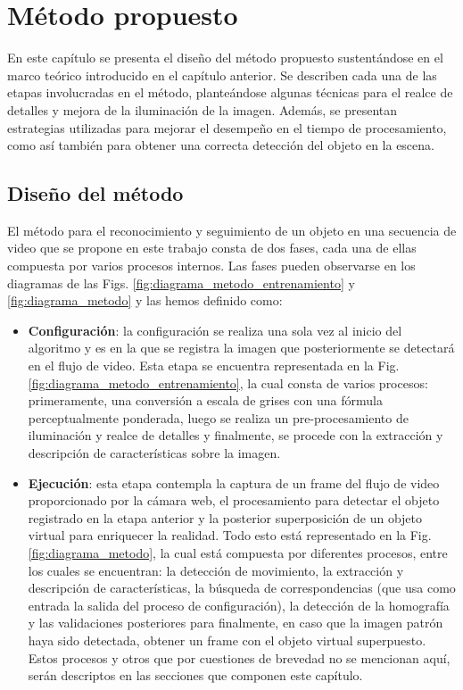 \chapter{Método propuesto}
\label{c:parte4}
\vspace{1cm}
En este capítulo se presenta el diseño del método propuesto sustentándose en el marco teórico introducido en el capítulo anterior. Se describen cada una de las etapas involucradas en el método, planteándose algunas técnicas para el realce de detalles y mejora de la iluminación de la imagen. Además, se presentan estrategias utilizadas para mejorar el desempeño en el tiempo de procesamiento, como así también para obtener una correcta detección del objeto en la escena.
\section{Diseño del método}
El método para el reconocimiento y seguimiento de un objeto en una secuencia de video que se propone en este trabajo consta de dos fases, cada una de ellas compuesta por varios procesos internos. Las fases pueden observarse en los diagramas de las Figs. \ref{fig:diagrama_metodo_entrenamiento} y \ref{fig:diagrama_metodo}  y las hemos definido como:
\begin{itemize}
 \item \textbf{Configuración}: la configuración se realiza una sola vez al inicio del algoritmo y es en la que se registra la imagen que posteriormente se detectará en el flujo de video. Esta etapa se encuentra representada en la Fig. \ref{fig:diagrama_metodo_entrenamiento}, la cual consta de varios procesos: primeramente, una conversión a escala de grises con una fórmula perceptualmente ponderada, luego se realiza un pre-procesamiento de iluminación y realce de detalles y finalmente, se procede con la extracción y descripción de características sobre la imagen.
 \item \textbf{Ejecución}: esta etapa contempla la captura de un frame del flujo de video proporcionado por la cámara web, el procesamiento para detectar el objeto registrado en la etapa anterior y la posterior superposición de un objeto virtual para enriquecer la realidad. Todo esto está representado en la Fig. \ref{fig:diagrama_metodo}, la cual está compuesta por diferentes procesos, entre los cuales se encuentran: la detección de movimiento, la extracción y descripción de características, la búsqueda de correspondencias (que usa como entrada la salida del proceso de configuración), la detección de la homografía y las validaciones posteriores para finalmente, en caso que la imagen patrón haya sido detectada, obtener un frame con el objeto virtual superpuesto. Estos procesos y otros que por cuestiones de brevedad no se mencionan aquí, serán descriptos en las secciones que componen este capítulo.
\end{itemize}
